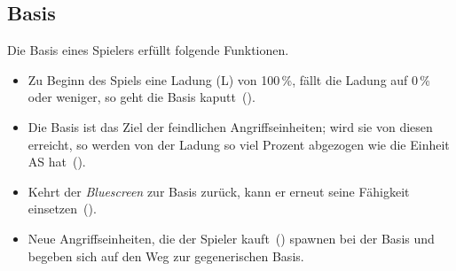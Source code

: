 \subsection{Basis}

Die Basis eines Spielers erfüllt folgende Funktionen.

\begin{itemize}
  \item Zu Beginn des Spiels eine Ladung (L) von 100\,\%, fällt die Ladung auf
    0\,\% oder weniger, so geht die Basis kaputt~().

  \item Die Basis ist das Ziel der feindlichen Angriffseinheiten; wird sie von
    diesen erreicht, so werden von der Ladung so viel Prozent abgezogen wie die
    Einheit AS hat~().

  \item Kehrt der \emph{Bluescreen} zur Basis zurück, kann er erneut seine
    Fähigkeit einsetzen~().

  \item Neue Angriffseinheiten, die der Spieler kauft~()
    spawnen bei der Basis und begeben sich auf den Weg zur gegenerischen Basis.

\end{itemize}
